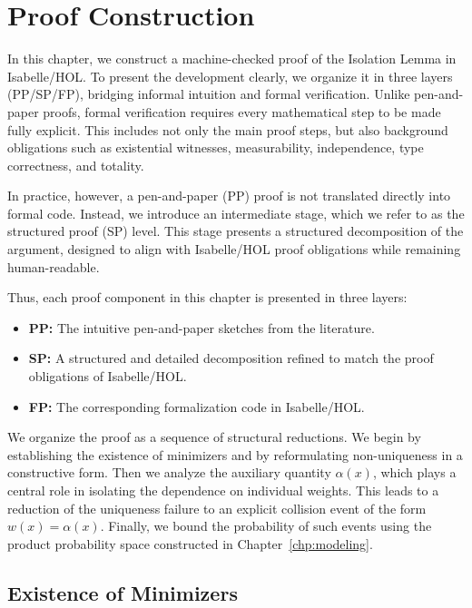 \chapter{Proof Construction}
\label{chp:proof}

In this chapter, we construct a machine-checked proof of the Isolation Lemma in Isabelle/HOL.
To present the development clearly, we organize it in three layers (PP/SP/FP), bridging informal intuition and formal verification.
Unlike pen-and-paper proofs, formal verification requires every mathematical step to be made fully explicit.
This includes not only the main proof steps, but also background obligations such as existential witnesses, measurability, independence, type correctness, and totality.

In practice, however, a pen-and-paper (PP) proof is not translated directly into formal code.
Instead, we introduce an intermediate stage, which we refer to as the structured proof (SP) level.
This stage presents a structured decomposition of the argument, designed to align with Isabelle/HOL proof obligations while remaining human-readable.

Thus, each proof component in this chapter is presented in three layers:
\begin{itemize}
    \item \textbf{PP:} The intuitive pen-and-paper sketches from the literature.
    \item \textbf{SP:} A structured and detailed decomposition refined to match the proof obligations of Isabelle/HOL.
    \item \textbf{FP:} The corresponding formalization code in Isabelle/HOL.
\end{itemize}

We organize the proof as a sequence of structural reductions.
We begin by establishing the existence of minimizers and by reformulating non-uniqueness in a constructive form.
Then we analyze the auxiliary quantity $\alpha(x)$, which plays a central role in isolating the dependence on individual weights.
This leads to a reduction of the uniqueness failure to an explicit collision event of the form $w(x) = \alpha(x)$.
Finally, we bound the probability of such events using the product probability space constructed in Chapter~\ref{chp:modeling}.

\section{Existence of Minimizers}
\label{sec:existence}

